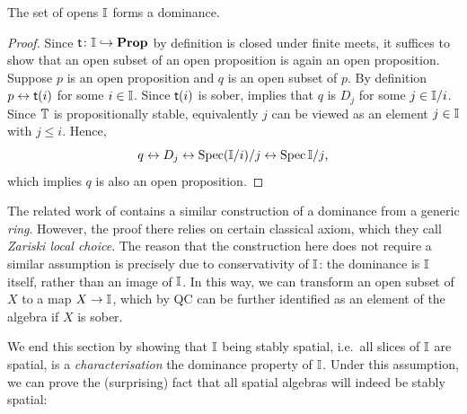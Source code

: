 \begin{proposition}[\AxiomSQCI]\label{prop:Idominance}
  The set of opens $\mathbb{I}$ forms a dominance.
\end{proposition}
\begin{proof}
  Since $\mathsf{t}\colon \mathbb{I} \hookrightarrow \mathbf{Prop}$ by definition is closed under finite meets, it suffices to show that an open subset of an open proposition is again an open proposition. Suppose $p$ is an open proposition and $q$ is an open subset of $p$. By definition $p \leftrightarrow \mathsf{t}(i)$ for some $i \in \mathbb{I}$. Since $\mathsf{t}(i)$ is sober,  implies that $q$ is $D_j$ for some $j \in \mathbb{I}/i$. Since $\mathbb{T}$ is propositionally stable, equivalently $j$ can be viewed as an element $j \in \mathbb{I}$ with $j \le i$. Hence,
  \[ q \leftrightarrow D_j \leftrightarrow \operatorname{Spec}(\mathbb{I}/i)/j \leftrightarrow \operatorname{Spec}\mathbb{I}/j\text{,} \]
  which implies $q$ is also an open proposition.
\end{proof}

\begin{remark}\label{rem:dominancewithoutchoice}
  The related work of \citet{Cherubini_Coquand_Hutzler_2024} contains a similar construction of a dominance from a generic \emph{ring}. However, the proof there relies on certain classical axiom, which they call \emph{Zariski local choice}. The reason that the construction here does not require a similar assumption is precisely due to conservativity of $\mathbb{I}$: the dominance is $\mathbb{I}$ itself, rather than an image of $\mathbb{I}$. In this way, we can transform an open subset of $X$ to a map $X \to \mathbb{I}$, which by \gls{QC} can be further identified as an element of the algebra if $X$ is sober. 
\end{remark}

We end this section by showing that $\mathbb{I}$ being stably spatial, i.e.\ all slices of $\mathbb{I}$ are spatial, is a \emph{characterisation} the dominance property of $\mathbb{I}$. Under this assumption, we can prove the (surprising) fact that all spatial algebras will indeed be stably spatial:

